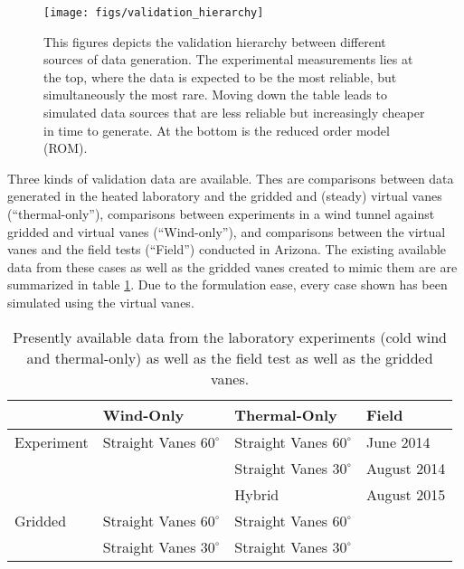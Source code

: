 %
%
 \begin{figure}[!htb]
   \begin{center}
    \texttt{[image: figs/validation\_hierarchy]}
    \caption{This figures depicts the validation hierarchy between different 
      sources of data generation. The experimental measurements lies at the top, 
      where the data is expected to be the most reliable, but simultaneously the most rare. 
      Moving down the table leads to simulated data sources that are less reliable but 
      increasingly cheaper in time to generate. At the bottom is the reduced order model (ROM).}
    \label{fig:val_hier}
   \end{center}
 \end{figure}

Three kinds of validation data are available. Thes are comparisons between data generated in the 
heated laboratory and the gridded and (steady) virtual vanes (``thermal-only''), comparisons between 
experiments in a wind tunnel against gridded and virtual vanes (``Wind-only''), and comparisons 
between the virtual vanes and the field tests (``Field'') conducted in Arizona. 
The existing available data from these cases as well as the gridded vanes created 
to mimic them are are summarized in table \ref{tab:val_data}. Due to the formulation ease, 
every case shown has been simulated using the virtual vanes. 

\large
\begin{table}[h]
\centering
\label{my-label}
\begin{tabular}{l|l|l|l|}
           & Wind-Only                   & Thermal-Only               & Field  \\
  \hline 
Experiment & Straight Vanes $60^{\circ}$ & Straight Vanes $60^{\circ}$ & June 2014   \\
           &                           & Straight Vanes $30^{\circ}$   & August 2014 \\
           &                           & Hybrid                        & August 2015 \\
  \hline 
Gridded    & Straight Vanes $60^{\circ}$ & Straight Vanes $60^{\circ}$ & \\
           & Straight Vanes $30^{\circ}$ & Straight Vanes $30^{\circ}$ & \\
  \hline 
\end{tabular}
  \caption{Presently available data from the laboratory experiments 
    (cold wind and thermal-only) as well as the field test as well as the gridded vanes. }
  \label{tab:val_data}
\end{table}
%
%
%
%
%

